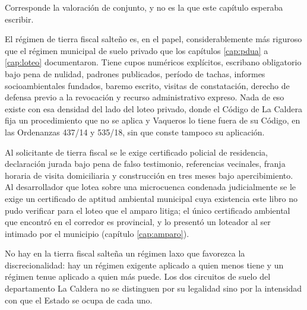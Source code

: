 \begin{cautela}
Corresponde la valoración de conjunto, y no es la que este capítulo esperaba escribir.

El régimen de tierra fiscal salteño es, en el papel, considerablemente más riguroso que el régimen municipal de suelo privado que los capítulos \ref{cap:pdua} a \ref{cap:loteo} documentaron. Tiene cupos numéricos explícitos, escribano obligatorio bajo pena de nulidad, padrones publicados, período de tachas, informes socioambientales fundados, baremo escrito, visitas de constatación, derecho de defensa previo a la revocación y recurso administrativo expreso. Nada de eso existe con esa densidad del lado del loteo privado, donde el Código de La Caldera fija un procedimiento que no se aplica y Vaqueros lo tiene fuera de su Código, en las Ordenanzas 437/14 y 535/18, sin que conste tampoco su aplicación.

Al solicitante de tierra fiscal se le exige certificado policial de residencia, declaración jurada bajo pena de falso testimonio, referencias vecinales, franja horaria de visita domiciliaria y construcción en tres meses bajo apercibimiento. Al desarrollador que lotea sobre una microcuenca condenada judicialmente se le exige un certificado de aptitud ambiental municipal cuya existencia este libro no pudo verificar para el loteo que el amparo litiga; el único certificado ambiental que encontró en el corredor es provincial, y lo presentó un loteador al ser intimado por el municipio (capítulo \ref{cap:amparo}).

No hay en la tierra fiscal salteña un régimen laxo que favorezca la discrecionalidad: hay un régimen exigente aplicado a quien menos tiene y un régimen tenue aplicado a quien más puede. Los dos circuitos de suelo del departamento La Caldera no se distinguen por su legalidad sino por la intensidad con que el Estado se ocupa de cada uno.
\end{cautela}
